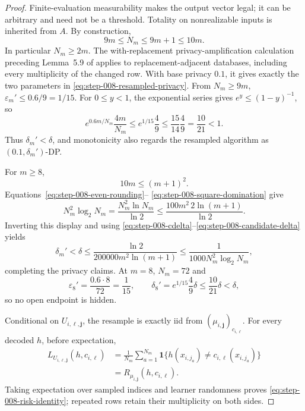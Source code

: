 \begin{proof}
Finite-evaluation measurability makes the output vector legal; it can be
arbitrary and need not be a threshold.  Totality on nonrealizable inputs is
inherited from \(A\).  By construction,
\begin{equation}\label{eq:step-008-even-rounding}
9m\le N_m\le9m+1\le10m.
\end{equation}
In particular \(N_m\ge2m\).  The with-replacement privacy-amplification
calculation preceding Lemma~5.9 of
\citet{bunNissimStemmerVadhan2015} applies to replacement-adjacent
databases, including every multiplicity of the changed row.  With base
privacy \(0.1\), it gives exactly the two parameters in
\eqref{eq:step-008-resampled-privacy}.  From \(N_m\ge9m\),
\(\varepsilon_m'\le0.6/9=1/15\).  For \(0\le y<1\), the exponential
series gives \(e^y\le(1-y)^{-1}\), so
\begin{equation}\label{eq:step-008-delta-contraction}
e^{0.6m/N_m}\frac{4m}{N_m}
\le e^{1/15}\frac49
\le\frac{15}{14}\frac49
=\frac{10}{21}<1.
\end{equation}
Thus \(\delta_m'<\delta\), and monotonicity also regards the resampled
algorithm as \((0.1,\delta_m')\)-DP.

For \(m\ge8\),
\begin{equation}\label{eq:step-008-square-domination}
10m\le(m+1)^2.
\end{equation}
Equations~\eqref{eq:step-008-even-rounding}--
\eqref{eq:step-008-square-domination} give
\begin{equation}\label{eq:step-008-delta-scale-translation}
N_m^2\log_2N_m
=\frac{N_m^2\ln N_m}{\ln2}
\le\frac{100m^2\,2\ln(m+1)}{\ln2}.
\end{equation}
Inverting this display and using
\eqref{eq:step-008-cdelta}--\eqref{eq:step-008-candidate-delta} yields
\[
\delta_m'<\delta
\le\frac{\ln2}{200000m^2\ln(m+1)}
\le\frac1{1000N_m^2\log_2N_m},
\]
completing the privacy claims.  At \(m=8\), \(N_m=72\) and
\[
\varepsilon_8'=\frac{0.6\cdot8}{72}=\frac1{15},
\qquad
\delta_8'=e^{1/15}\frac49\delta
\le\frac{10}{21}\delta<\delta,
\]
so no open endpoint is hidden.

Conditional on \(U_{i,\ell,\mathbf j}\), the resample is exactly iid from
\((\mu_{i,\mathbf j})_{c_{i,\ell}}\).  For every decoded \(h\), before
expectation,
\begin{equation}\label{eq:step-008-pointwise-risk-identity}
\begin{split}
L_{U_{i,\ell,\mathbf j}}(h,c_{i,\ell})
&=\frac1{N_m}\sum_{a=1}^{N_m}
\mathbf1\{h(x_{i,j_a})\ne c_{i,\ell}(x_{i,j_a})\}\\
&=R_{\mu_{i,\mathbf j}}(h,c_{i,\ell}).
\end{split}
\end{equation}
Taking expectation over sampled indices and learner randomness proves
\eqref{eq:step-008-risk-identity}; repeated rows retain their multiplicity
on both sides.
\end{proof}

